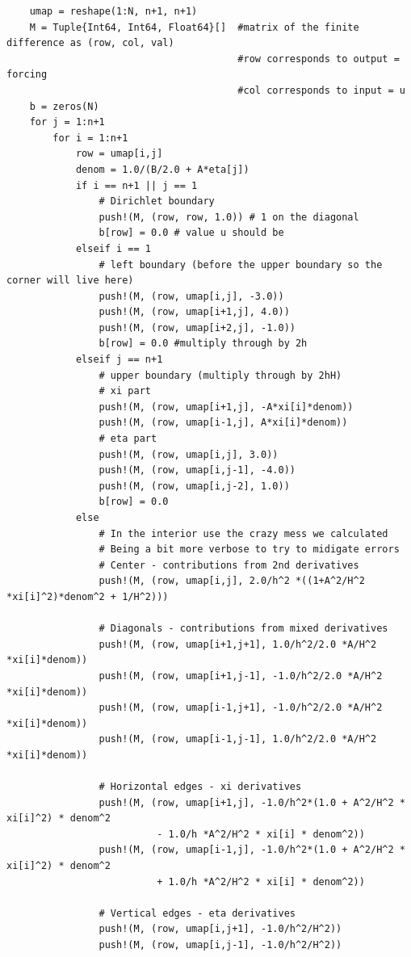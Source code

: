 \documentclass[12pt]{article}
\begin{document}
\begin{problems}
\begin{verbatim}
    umap = reshape(1:N, n+1, n+1)
    M = Tuple{Int64, Int64, Float64}[]  #matrix of the finite difference as (row, col, val)
                                        #row corresponds to output = forcing
                                        #col corresponds to input = u
    b = zeros(N)
    for j = 1:n+1
        for i = 1:n+1
            row = umap[i,j]
            denom = 1.0/(B/2.0 + A*eta[j])
            if i == n+1 || j == 1
                # Dirichlet boundary
                push!(M, (row, row, 1.0)) # 1 on the diagonal
                b[row] = 0.0 # value u should be
            elseif i == 1
                # left boundary (before the upper boundary so the corner will live here)
                push!(M, (row, umap[i,j], -3.0))
                push!(M, (row, umap[i+1,j], 4.0))
                push!(M, (row, umap[i+2,j], -1.0))
                b[row] = 0.0 #multiply through by 2h
            elseif j == n+1
                # upper boundary (multiply through by 2hH)
                # xi part
                push!(M, (row, umap[i+1,j], -A*xi[i]*denom))
                push!(M, (row, umap[i-1,j], A*xi[i]*denom))
                # eta part
                push!(M, (row, umap[i,j], 3.0))
                push!(M, (row, umap[i,j-1], -4.0))
                push!(M, (row, umap[i,j-2], 1.0))
                b[row] = 0.0
            else
                # In the interior use the crazy mess we calculated
                # Being a bit more verbose to try to midigate errors
                # Center - contributions from 2nd derivatives
                push!(M, (row, umap[i,j], 2.0/h^2 *((1+A^2/H^2 *xi[i]^2)*denom^2 + 1/H^2)))

                # Diagonals - contributions from mixed derivatives
                push!(M, (row, umap[i+1,j+1], 1.0/h^2/2.0 *A/H^2 *xi[i]*denom))
                push!(M, (row, umap[i+1,j-1], -1.0/h^2/2.0 *A/H^2 *xi[i]*denom))
                push!(M, (row, umap[i-1,j+1], -1.0/h^2/2.0 *A/H^2 *xi[i]*denom))
                push!(M, (row, umap[i-1,j-1], 1.0/h^2/2.0 *A/H^2 *xi[i]*denom))

                # Horizontal edges - xi derivatives
                push!(M, (row, umap[i+1,j], -1.0/h^2*(1.0 + A^2/H^2 * xi[i]^2) * denom^2
                          - 1.0/h *A^2/H^2 * xi[i] * denom^2))
                push!(M, (row, umap[i-1,j], -1.0/h^2*(1.0 + A^2/H^2 * xi[i]^2) * denom^2
                          + 1.0/h *A^2/H^2 * xi[i] * denom^2))

                # Vertical edges - eta derivatives
                push!(M, (row, umap[i,j+1], -1.0/h^2/H^2))
                push!(M, (row, umap[i,j-1], -1.0/h^2/H^2))


\end{verbatim}
\end{problems}
\end{document}
